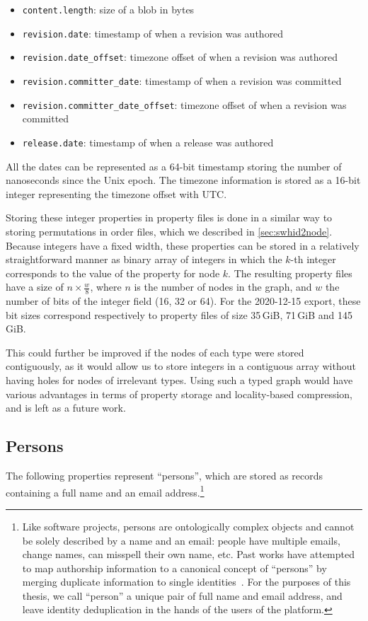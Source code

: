 \begin{itemize}
    \setlength\itemsep{0em}
    \item \texttt{content.length}: size of a blob in bytes
    \item \texttt{revision.date}: timestamp of when a revision was authored
    \item \texttt{revision.date\_offset}: timezone offset of when a revision
        was authored
    \item \texttt{revision.committer\_date}: timestamp of when a revision was
        committed
    \item \texttt{revision.committer\_date\_offset}: timezone offset of when a
        revision was committed
    \item \texttt{release.date}: timestamp of when a release was authored
\end{itemize}

All the dates can be represented as a 64-bit timestamp storing the number of
nanoseconds since the Unix epoch. The timezone information is stored as a
16-bit integer representing the timezone offset with UTC.

Storing these integer properties in property files is done in a similar way
to storing permutations in order files, which we described in
\cref{sec:swhid2node}. Because integers have a fixed width, these properties
can be stored in a relatively straightforward manner as binary array of
integers in which the $k$-th integer corresponds to the value of the property
for node $k$.  The resulting property files have a size of {\Large $n \times
\frac{w}{8}$}, where $n$ is the number of nodes in the graph, and $w$ the
number of bits of the integer field (16, 32 or 64). For the 2020-12-15 export,
these bit sizes correspond respectively to property files of size 35\,GiB,
71\,GiB and 145\,GiB.

This could further be improved if the nodes of each type were stored
contiguously, as it would allow us to store integers in a contiguous array
without having holes for nodes of irrelevant types. Using such a typed graph
would have various advantages in terms of property storage and locality-based
compression, and is left as a future work.

\subsection{Persons}%
\label{sec:mapping-persons}

The following properties represent ``persons'', which are stored as records
containing a full name and an email address.\footnote{Like software projects,
persons are ontologically complex objects and cannot be solely described by a
name and an email: people have multiple emails, change names, can misspell
their own name, etc. Past works have attempted to map authorship information to
a canonical concept of ``persons'' by merging duplicate information to single
identities~\cite{wiese2016mailing, zhu2019empirical}. For the purposes of this
thesis, we call ``person'' a unique pair of full name and email address, and
leave identity deduplication in the hands of the users of the platform.}

